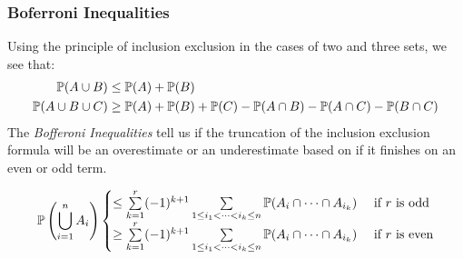 \documentclass[../main.tex]{subfiles}
\begin{document}
\subsubsection{Boferroni Inequalities}
Using the principle of inclusion exclusion in the cases of two and three sets, we see that:
\begin{align*}
  \P(A \cup B) &\leq \P(A) + \P(B) \\
  \P(A \cup B \cup C) &\geq \P(A) + \P(B) + \P(C) - \P(A \cap B) - \P(A \cap C) - \P(B \cap C) \\
\end{align*}
The \textit{Bofferoni Inequalities} tell us if the truncation of the inclusion exclusion formula will be an overestimate or an underestimate based on if it finishes on an even or odd term.
\begin{proposition}
  \[
    \P\left(\bigcup_{i = 1}^{n} A_i\right) \begin{cases}
    \leq \sum\limits_{k = 1}^{r} (-1)^{k + 1} \sum\limits_{1 \leq i_1 < \cdots < i_k \leq n} \P(A_i \cap \cdots \cap A_{i_k}) & \text{ if $r$ is odd} \\

    \geq \sum\limits_{k = 1}^{r} (-1)^{k + 1} \sum\limits_{1 \leq i_1 < \cdots < i_k \leq n} \P(A_i \cap \cdots \cap A_{i_k}) & \text{ if $r$ is even} \\
    \end{cases}
  \]
\end{proposition}
\end{document}
